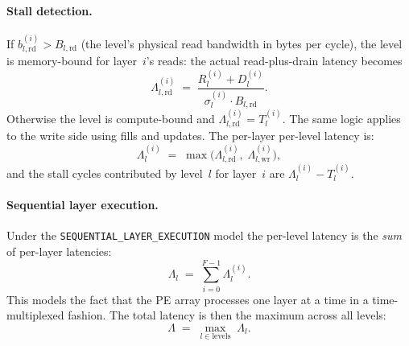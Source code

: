 \paragraph{Stall detection.}
If $b_{l,\text{rd}}^{(i)} > B_{l,\text{rd}}$ (the level's physical
read bandwidth in bytes per cycle), the level is memory-bound for
layer~$i$'s reads: the actual read-plus-drain latency becomes
%
\begin{equation}
\label{eq:ps-stall-lat}
  \Lambda_{l,\text{rd}}^{(i)} \;=\;
    \frac{R_l^{(i)} + D_l^{(i)}}
         {\sigma_l^{(i)} \cdot B_{l,\text{rd}}}.
\end{equation}
%
\noindent
Otherwise the level is compute-bound and
$\Lambda_{l,\text{rd}}^{(i)} = T_l^{(i)}$.
The same logic applies to the write side using fills and updates.
The per-layer per-level latency is:
%
\begin{equation}
\label{eq:ps-lat-per-layer}
  \Lambda_l^{(i)} \;=\;
    \max\!\bigl(
      \Lambda_{l,\text{rd}}^{(i)},\;
      \Lambda_{l,\text{wr}}^{(i)}
    \bigr),
\end{equation}
%
\noindent
and the stall cycles contributed by level~$l$ for layer~$i$ are
$\Lambda_l^{(i)} - T_l^{(i)}$.

\paragraph{Sequential layer execution.}
Under the \texttt{SEQUENTIAL\_LAYER\_EXECUTION} model the
per-level latency is the \emph{sum} of per-layer latencies:
%
\begin{equation}
\label{eq:ps-sequential-lat}
  \Lambda_l \;=\;
    \sum_{i=0}^{F-1} \Lambda_l^{(i)}.
\end{equation}
%
\noindent
This models the fact that the PE array processes one layer at a time
in a time-multiplexed fashion.
The total latency is then the maximum across all levels:
%
\begin{equation}
\label{eq:ps-total-lat}
  \Lambda \;=\;
    \max_{l \in \text{levels}} \;\Lambda_l.
\end{equation}

